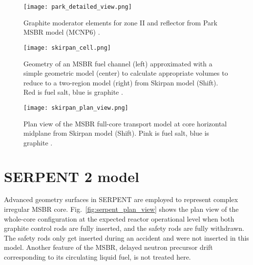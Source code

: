 \begin{figure}[hbp!] %
  \centering
  \vspace{-0.3em}
  \texttt{[image: park\_detailed\_view.png]}
  \caption{Graphite moderator elements  for zone II and reflector from Park \gls{MSBR} model (MCNP6) \cite{park_whole_2015}.}
  \vspace{-0.6em}
  \label{fig:park}
\end{figure}
\FloatBarrier

\begin{figure}[htp!] %
  \centering
  \vspace{-0.3em}
  \texttt{[image: skirpan\_cell.png]}
  \caption{Geometry of an MSBR fuel channel (left) approximated with a simple geometric model (center) to calculate appropriate volumes to reduce to a two-region model (right) from Skirpan model (Shift). Red is fuel salt, blue is graphite \cite{skirpan_fuel_2017}.}
  \vspace{-0.6em}
  \label{fig:skirpan_cell}
\end{figure}

\begin{figure}[hbp!] %
  \centering
  \vspace{-0.3em}
  \texttt{[image: skirpan\_plan\_view.png]}
  \caption{Plan view of the \gls{MSBR} full-core transport model at core horizontal midplane from Skirpan model (Shift). Pink is fuel salt, blue is graphite \cite{skirpan_fuel_2017}.}
  \vspace{-0.6em}
  \label{fig:skirpan_plan}
\end{figure}
\FloatBarrier

\section{SERPENT 2 model}

Advanced geometry surfaces in SERPENT are employed to represent complex irregular \gls{MSBR} core. Fig.~\ref{fig:serpent_plan_view} shows the plan view of the whole-core configuration at the expected reactor operational level when both graphite control rods are fully inserted, and the safety rods are fully withdrawn. The safety rods only get inserted during an accident and were not inserted in this model. Another feature of the \gls{MSBR}, delayed neutron precursor drift corresponding to its circulating liquid fuel, is not treated here. 

